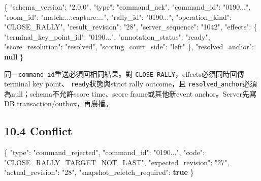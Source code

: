 \documentclass[
  9pt,
  a4paper,
]{article}
\newenvironment{Shaded}{}{}
\newcommand{\DataTypeTok}[1]{\textcolor[rgb]{0.56,0.13,0.00}{#1}}
\newcommand{\FunctionTok}[1]{\textcolor[rgb]{0.02,0.16,0.49}{#1}}
\newcommand{\KeywordTok}[1]{\textcolor[rgb]{0.00,0.44,0.13}{\textbf{#1}}}
\newcommand{\StringTok}[1]{\textcolor[rgb]{0.25,0.44,0.63}{#1}}
\begin{document}
\begin{Shaded}
\begin{Highlighting}[]
\FunctionTok{\{}
  \DataTypeTok{"schema\_\allowbreak{}version"}\FunctionTok{:} \StringTok{"2.0.0"}\FunctionTok{,}
  \DataTypeTok{"type"}\FunctionTok{:} \StringTok{"command\_\allowbreak{}ack"}\FunctionTok{,}
  \DataTypeTok{"command\_\allowbreak{}id"}\FunctionTok{:} \StringTok{"0190..."}\FunctionTok{,}
  \DataTypeTok{"room\_\allowbreak{}id"}\FunctionTok{:} \StringTok{"match:...:capture:..."}\FunctionTok{,}
  \DataTypeTok{"rally\_\allowbreak{}id"}\FunctionTok{:} \StringTok{"0190..."}\FunctionTok{,}
  \DataTypeTok{"operation\_\allowbreak{}kind"}\FunctionTok{:} \StringTok{"CLOSE\_\allowbreak{}RALLY"}\FunctionTok{,}
  \DataTypeTok{"result\_\allowbreak{}revision"}\FunctionTok{:} \StringTok{"28"}\FunctionTok{,}
  \DataTypeTok{"server\_\allowbreak{}sequence"}\FunctionTok{:} \StringTok{"1042"}\FunctionTok{,}
  \DataTypeTok{"effects"}\FunctionTok{:} \FunctionTok{\{}
    \DataTypeTok{"terminal\_\allowbreak{}key\_\allowbreak{}point\_\allowbreak{}id"}\FunctionTok{:} \StringTok{"0190..."}\FunctionTok{,}
    \DataTypeTok{"annotation\_\allowbreak{}status"}\FunctionTok{:} \StringTok{"ready"}\FunctionTok{,}
    \DataTypeTok{"score\_\allowbreak{}resolution"}\FunctionTok{:} \StringTok{"resolved"}\FunctionTok{,}
    \DataTypeTok{"scoring\_\allowbreak{}court\_\allowbreak{}side"}\FunctionTok{:} \StringTok{"left"}
  \FunctionTok{\},}
  \DataTypeTok{"resolved\_\allowbreak{}anchor"}\FunctionTok{:} \KeywordTok{null}
\FunctionTok{\}}
\end{Highlighting}
\end{Shaded}

同一\texttt{command\_\allowbreak{}id}重送必須回相同結果。對
\texttt{CLOSE\_\allowbreak{}RALLY}，effects必須同時回傳terminal key point、
\texttt{ready}狀態與strict rally outcome，且
\texttt{resolved\_\allowbreak{}anchor}必須為null；schema不允許score time、score
frame或其他新event anchor。Server先寫DB transaction/outbox，再廣播。

\subsection{10.4 Conflict}\label{104-conflict}

\begin{Shaded}
\begin{Highlighting}[]
\FunctionTok{\{}
  \DataTypeTok{"type"}\FunctionTok{:} \StringTok{"command\_\allowbreak{}rejected"}\FunctionTok{,}
  \DataTypeTok{"command\_\allowbreak{}id"}\FunctionTok{:} \StringTok{"0190..."}\FunctionTok{,}
  \DataTypeTok{"code"}\FunctionTok{:} \StringTok{"CLOSE\_\allowbreak{}RALLY\_\allowbreak{}TARGET\_\allowbreak{}NOT\_\allowbreak{}LAST"}\FunctionTok{,}
  \DataTypeTok{"expected\_\allowbreak{}revision"}\FunctionTok{:} \StringTok{"27"}\FunctionTok{,}
  \DataTypeTok{"actual\_\allowbreak{}revision"}\FunctionTok{:} \StringTok{"28"}\FunctionTok{,}
  \DataTypeTok{"snapshot\_\allowbreak{}refetch\_\allowbreak{}required"}\FunctionTok{:} \KeywordTok{true}
\FunctionTok{\}}
\end{Highlighting}
\end{Shaded}
\end{document}
